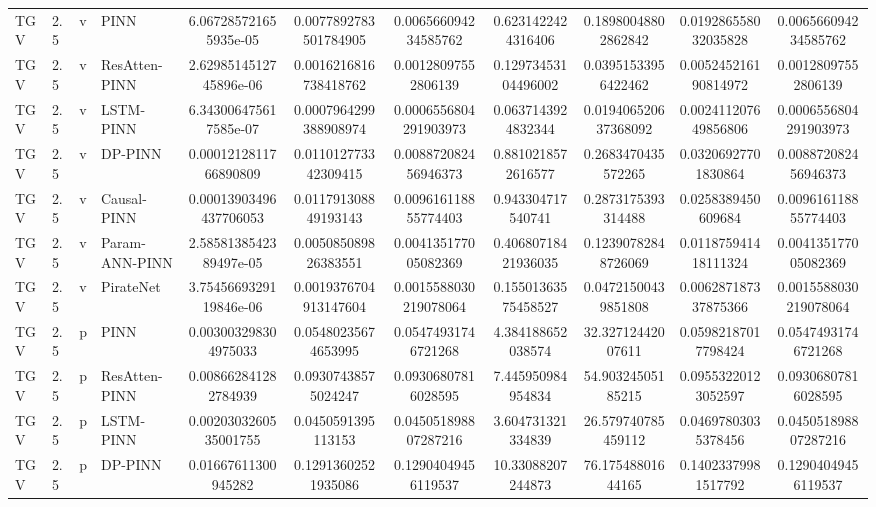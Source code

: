 \begin{landscape}
\begin{table}[p]
{\begin{tabular}{llllccccccc}
TGV &    2.5 &     v &           PINN &  6.067285721655935e-05 &  0.0077892783501784905 &   0.006566094234585762 &   0.6231422424316406 &   0.18980048802862842 &  0.019286558032035828 &   0.006566094234585762 \\
TGV &    2.5 &     v &  ResAtten-PINN & 2.6298514512745896e-06 &  0.0016216816738418762 &    0.00128097552806139 &  0.12973453104496002 &   0.03951533956422462 &  0.005245216190814972 &    0.00128097552806139 \\
TGV &    2.5 &     v &      LSTM-PINN &  6.343006475617585e-07 &  0.0007964299388908974 &  0.0006556804291903973 &   0.0637143924832344 &  0.019406520637368092 &  0.002411207649856806 &  0.0006556804291903973 \\
TGV &    2.5 &     v &        DP-PINN &  0.0001212811766890809 &   0.011012773342309415 &   0.008872082456946373 &   0.8810218572616577 &    0.2683470435572265 &   0.03206927701830864 &   0.008872082456946373 \\
TGV &    2.5 &     v &    Causal-PINN & 0.00013903496437706053 &   0.011791308849193143 &   0.009616118855774403 &    0.943304717540741 &    0.2873175393314488 &    0.0258389450609684 &   0.009616118855774403 \\
TGV &    2.5 &     v & Param-ANN-PINN & 2.5858138542389497e-05 &   0.005085089826383551 &   0.004135177005082369 &  0.40680718421936035 &   0.12390782848726069 &  0.011875941418111324 &   0.004135177005082369 \\
TGV &    2.5 &     v &      PirateNet & 3.7545669329119846e-06 &  0.0019376704913147604 &  0.0015588030219078064 &  0.15501363575458527 &   0.04721500439851808 &  0.006287187337875366 &  0.0015588030219078064 \\
TGV &    2.5 &     p &           PINN &   0.003003298304975033 &    0.05480235674653995 &    0.05474931746721268 &    4.384188652038574 &     32.32712442007611 &   0.05982187017798424 &    0.05474931746721268 \\
TGV &    2.5 &     p &  ResAtten-PINN &   0.008662841282784939 &    0.09307438575024247 &    0.09306807816028595 &    7.445950984954834 &     54.90324505185215 &   0.09553220123052597 &    0.09306807816028595 \\
TGV &    2.5 &     p &      LSTM-PINN &  0.0020303260535001755 &     0.0450591395113153 &   0.045051898807287216 &    3.604731321334839 &    26.579740785459112 &   0.04697803035378456 &   0.045051898807287216 \\
TGV &    2.5 &     p &        DP-PINN &    0.01667611300945282 &    0.12913602521935086 &    0.12904049456119537 &    10.33088207244873 &     76.17548801644165 &   0.14023379981517792 &    0.12904049456119537 \\

\end{tabular}}
\end{table}
\end{landscape}
